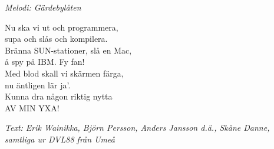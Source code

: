 {\footnotesize\textit{Melodi: Gärdebylåten}}\par
\vspace{10pt}
Nu ska vi ut och programmera,\\
supa och slås och kompilera.\\
Bränna SUN-stationer, slå en Mac,\\
å spy på IBM. Fy fan!\\
Med blod skall vi skärmen färga,\\
nu äntligen lär ja'.\\
Kunna dra någon riktig nytta\\
AV MIN YXA!\par
\vspace{10pt}
{\footnotesize\textit{Text: Erik Wainikka, Björn Persson, Anders Jansson d.ä., Skåne Danne, samtliga ur DVL88 från Umeå}}
